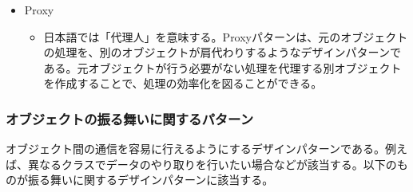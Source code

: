 \documentclass[dvipdfmx]{jsarticle}
\begin{document}
\begin{itemize}
\begin{itemize}
  \end{itemize}
  \item Proxy
  \begin{itemize}
    \item 日本語では「代理人」を意味する。Proxyパターンは、元のオブジェクトの処理を、別のオブジェクトが肩代わりするようなデザインパターンである。元オブジェクトが行う必要がない処理を代理する別オブジェクトを作成することで、処理の効率化を図ることができる。
  \end{itemize}
\end{itemize}
\subsubsection{オブジェクトの振る舞いに関するパターン}
オブジェクト間の通信を容易に行えるようにするデザインパターンである。例えば、異なるクラスでデータのやり取りを行いたい場合などが該当する。以下のものが振る舞いに関するデザインパターンに該当する。
\end{document}
